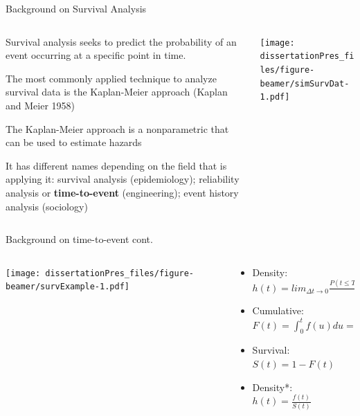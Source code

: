 \documentclass[
  ignorenonframetext,
]{beamer}
\begin{document}
\begin{frame}{Background on Survival Analysis}
\label{background-on-survival-analysis}
\begin{columns}[T]
\begin{column}{0.6\textwidth}
Survival analysis seeks to predict the probability of an event occurring
at a specific point in time.

The most commonly applied technique to analyze survival data is the
Kaplan-Meier approach (Kaplan and Meier 1958)

The Kaplan-Meier approach is a nonparametric that can be used to
estimate hazards

It has different names depending on the field that is applying it:
survival analysis (epidemiology); reliability analysis or
\textbf{time-to-event} (engineering); event history analysis (sociology)
\end{column}

\begin{column}{0.4\textwidth}
\texttt{[image: dissertationPres\_files/figure-beamer/simSurvDat-1.pdf]}
\end{column}
\end{columns}
\end{frame}

\begin{frame}{Background on time-to-event cont.}
\label{background-on-time-to-event-cont.}
\begin{columns}[T]
\begin{column}{0.4\textwidth}
\texttt{[image: dissertationPres\_files/figure-beamer/survExample-1.pdf]}
\end{column}

\begin{column}{0.6\textwidth}
\begin{itemize}
\item
  Density:\\
  \(h(t) = lim_{\Delta t \rightarrow0}\frac{P(t\leq T < t + \Delta t | T \geq t)}{\Delta t}\)
\item
  Cumulative:\\
  \(F(t) = \int_{0}^{t} f(u) du = P(T < t)\)
\item
  Survival:\\
  \(S(t) = 1 - F(t)\)
\item
  Density*:\\
  \(h(t) = \frac{f(t)}{S(t)}\)
\end{itemize}
\end{column}
\end{columns}
\end{frame}
\end{document}
